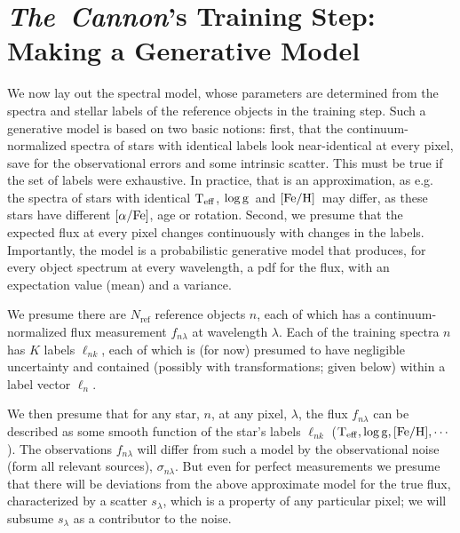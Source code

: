 \documentclass[12pt, preprint]{aastex}
\newcommand{\tc}{\textsl{The~Cannon}}
\newcommand{\set}[1]{\bm{#1}}
\newcommand{\starlabel}{\ell}
\newcommand{\starlabelvec}{\set{\starlabel}}
\newcommand{\teff}{\mbox{$\rm T_{eff}$}}
\newcommand{\feh}{\mbox{$\rm [Fe/H]$}}
\newcommand{\alphafe}{\mbox{$\rm [\alpha/Fe]$}}
\newcommand{\logg}{\mbox{$\rm \log g$}}
\newcommand{\noise}{\sigma_{n\lambda}}
\newcommand{\scatter}{s_{\lambda}}
\newcommand{\rfn}{\mathrm{ref}}
\begin{document}
\section{\tc 's Training Step: Making a Generative Model}
\label{sec:spectralmodel}

We now lay out the spectral model, whose parameters are determined 
from the spectra and stellar labels of the reference objects in the training step.
Such a generative model is based on two basic notions: first, that the continuum-normalized spectra of
stars with identical labels look near-identical at every pixel, save for the observational errors
and some intrinsic scatter. This must be true if the set of labels were exhaustive. 
In practice, that is an approximation, as e.g. the spectra of stars with identical \teff , \logg \ and \feh\ may differ, 
as these stars have different \alphafe , age or rotation. Second, we presume that the expected flux at every pixel changes continuously
with changes in the labels.
Importantly, the model is a probabilistic generative model that produces,
for every object spectrum at every wavelength,
a pdf for the flux, with an expectation value (mean) and a variance.

We presume there are $N_\rfn$ reference objects $n$, each of which has
a continuum-normalized flux measurement $f_{n\lambda}$ at wavelength
$\lambda$. Each of the training spectra $n$ has $K$ labels $\starlabel_{nk}$, each of which
is (for now) presumed to have negligible uncertainty and contained (possibly with transformations; given below)
within a label vector $\starlabelvec_n$.

We then presume that for any star, $n$, at any pixel, $\lambda$,
the flux $f_{n\lambda}$  can be described as some smooth function of the star's labels $\starlabel_{nk}$
($\teff,\logg,\feh,\cdots$).
The observations $f_{n\lambda}$ will differ from such a model by the observational noise (form all relevant sources), $\noise$. But even for perfect measurements we presume that there will be
deviations from the above approximate model for the true flux, characterized by a scatter $\scatter$,
which is a property of any particular pixel; we will subsume $\scatter$ as a contributor to the noise.
\end{document}
